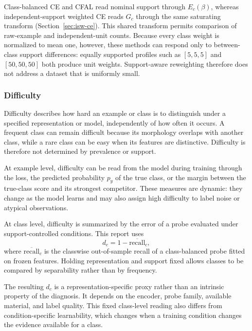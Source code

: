 \documentclass[11pt]{article}
\begin{document}
Class-balanced CE and CFAL read nominal support through $E_c(\beta)$, whereas independent-support weighted CE reads $G_c$ through the same saturating transform (Section~\ref{sec:isw-ce}). This shared transform permits comparison of raw-example and independent-unit counts. Because every class weight is normalized to mean one, however, these methods can respond only to between-class support differences: equally supported profiles such as $[5,5,5]$ and $[50,50,50]$ both produce unit weights. Support-aware reweighting therefore does not address a dataset that is uniformly small.

\subsubsection{Difficulty}
Difficulty describes how hard an example or class is to distinguish under a specified representation or model, independently of how often it occurs. A frequent class can remain difficult because its morphology overlaps with another class, while a rare class can be easy when its features are distinctive. Difficulty is therefore not determined by prevalence or support.

At example level, difficulty can be read from the model during training through the loss, the predicted probability $p_y$ of the true class, or the margin between the true-class score and its strongest competitor. These measures are dynamic: they change as the model learns and may also assign high difficulty to label noise or atypical observations.

At class level, difficulty is summarized by the error of a probe evaluated under support-controlled conditions. This report uses
\begin{equation}
  d_c = 1-\overline{\mathrm{recall}}_c,
  \label{eq:difficulty}
\end{equation}
\noindent where $\overline{\mathrm{recall}}_c$ is the classwise out-of-sample recall of a class-balanced probe fitted on frozen features. Holding representation and support fixed allows classes to be compared by separability rather than by frequency.

The resulting $d_c$ is a representation-specific proxy rather than an intrinsic property of the diagnosis. It depends on the encoder, probe family, available material, and label quality. This fixed class-level reading also differs from condition-specific learnability, which changes when a training condition changes the evidence available for a class.
\end{document}
